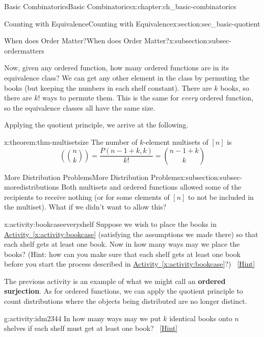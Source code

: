 \documentclass[oneside,10pt,]{book}
\newcommand{\terminology}[1]{\textbf{#1}}
\numberwithin{equation}{chapter}
\newcommand{\mchoose}[2]{\left(\!\binom{#1}{#2}\!\right)}
\begin{document}
\begin{chapterptx}{Basic Combinatorics}{}{Basic Combinatorics}{}{}{x:chapter:ch_basic-combinatorics}
\begin{sectionptx}{Counting with Equivalence}{}{Counting with Equivalence}{}{}{x:section:sec_basic-quotient}
\begin{subsectionptx}{When does Order Matter?}{}{When does Order Matter?}{}{}{x:subsection:subsec-ordermatters}
\par
Now, given any ordered function, how many ordered functions are in its equivalence class?  We can get any other element in the class by permuting the books (but keeping the numbers in each shelf constant).  There are \(k\) books, so there are \(k!\) ways to permute them.  This is the same for \emph{every} ordered function, so the equivalence classes all have the same size.%
\par
Applying the quotient principle, we arrive at the following.%
\begin{theorem}{}{}{x:theorem:thm-multisetsize}%
The number of \(k\)-element multisets of \([n]\) is%
\begin{equation*}
\mchoose{n}{k} = \frac{P(n-1+k, k)}{k!} = \binom{n-1+k}{k}
\end{equation*}
%
\end{theorem}
\end{subsectionptx}
%
%
\typeout{************************************************}
\typeout{************************************************}
%
\begin{subsectionptx}{More Distribution Problems}{}{More Distribution Problems}{}{}{x:subsection:subsec-moredistributions}
Both multisets and ordered functions allowed some of the recipients to receive nothing (or for some elements of \([n]\) to not be included in the multiset).  What if we didn't want to allow this?%
\begin{activity}{}{x:activity:bookcaseeveryshelf}%
Suppose we wish to place the books in \hyperref[x:activity:bookcase]{Activity~\ref{x:activity:bookcase}} (satisfying the assumptions we made there) so that each shelf gets at least one book. Now in how many ways may we place the books? (Hint: how can you make sure that each shelf gets at least one book before you start the process described in \hyperref[x:activity:bookcase]{Activity~\ref{x:activity:bookcase}}?)%
\qquad~\hfill{\tiny\hyperlink{g:hint:idm2324-back}{[Hint]}}\end{activity}
The previous activity is an example of what we might call an \terminology{ordered surjection}.  As for ordered functions, we can apply the quotient principle to count distributions where the objects being distributed are no longer distinct.%
\begin{activity}{}{g:activity:idm2344}%
In how many ways may we put \(k\) identical books onto \(n\) shelves if each shelf must get at least one book?%
\qquad~\hfill{\tiny\hyperlink{g:hint:idm2349-back}{[Hint]}}\end{activity}

\end{subsectionptx}
\end{sectionptx}
\end{chapterptx}
\end{document}
